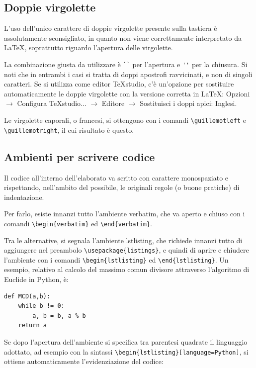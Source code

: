 \documentclass[12pt,italian]{report}
\begin{document}
\subsection{Doppie virgolette}

L'uso dell'unico carattere di doppie virgolette presente sulla tastiera è assolutamente sconsigliato, in quanto non viene correttamente interpretato da \LaTeX, soprattutto riguardo l'apertura delle virgolette.

La combinazione giusta da utilizzare è \verb|``| per l'apertura e \verb|''| per la chiusura. Si noti che in entrambi i casi si tratta di doppi apostrofi ravvicinati, e non di singoli caratteri. Se si utilizza come editor TeXstudio, c'è un'opzione per sostituire automaticamente le doppie virgolette con la versione corretta in \LaTeX: Opzioni $\rightarrow$ Configura TeXstudio... $\rightarrow$ Editore $\rightarrow$ Sostituisci i doppi apici: Inglesi.

Le virgolette caporali, o francesi, si ottengono con i comandi \verb|\guillemotleft| e \verb|\guillemotright|, il cui risultato è \guillemotleft questo\guillemotright.


\subsection{Ambienti per scrivere codice}

Il codice all'interno dell'elaborato va scritto con carattere monospaziato e rispettando, nell'ambito del possibile, le originali regole (o buone pratiche) di indentazione.

Per farlo, esiste innanzi tutto l'ambiente verbatim, che va aperto e chiuso con i comandi \verb|\begin{verbatim}| ed \verb|\end{verbatim}|.

Tra le alternative, si segnala l'ambiente lstlisting, che richiede innanzi tutto di aggiungere nel preambolo \verb|\usepackage{listings}|, e quindi di aprire e chiudere l'ambiente con i comandi \verb|\begin{lstlisting}| ed \verb|\end{lstlisting}|. Un esempio, relativo al calcolo del massimo comun divisore attraverso l'algoritmo di Euclide in Python, è:

\begin{lstlisting}
def MCD(a,b):
	while b != 0:
		a, b = b, a % b
	return a
\end{lstlisting}

Se dopo l'apertura dell'ambiente si specifica tra parentesi quadrate il linguaggio adottato, ad esempio con la sintassi \verb|\begin{lstlisting}[language=Python]|, si ottiene automaticamente l'evidenziazione del codice:
\end{document}
